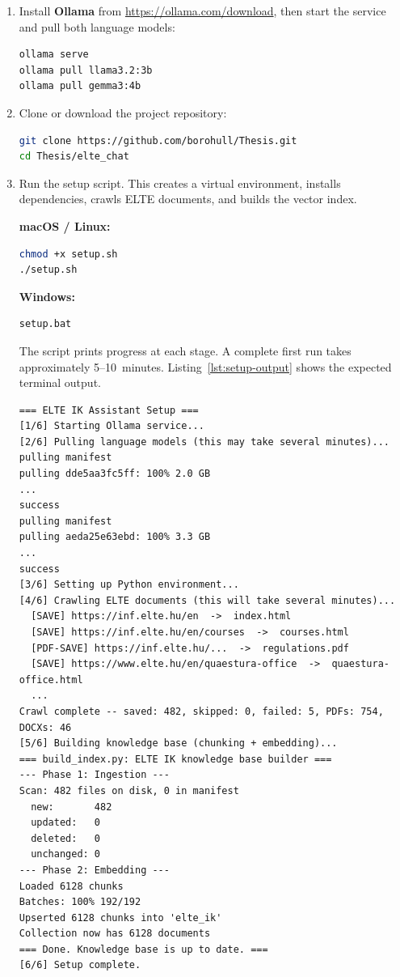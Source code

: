\begin{enumerate}
    \item Install \textbf{Ollama} from \url{https://ollama.com/download}, then
          start the service and pull both language models:
\begin{lstlisting}[language=bash]
ollama serve
ollama pull llama3.2:3b
ollama pull gemma3:4b
\end{lstlisting}

    \item Clone or download the project repository:
\begin{lstlisting}[language=bash]
git clone https://github.com/borohull/Thesis.git
cd Thesis/elte_chat
\end{lstlisting}

    \item Run the setup script. This creates a virtual environment, installs
          dependencies, crawls ELTE documents, and builds the vector index.

          \textbf{macOS / Linux:}
\begin{lstlisting}[language=bash]
chmod +x setup.sh
./setup.sh
\end{lstlisting}

          \textbf{Windows:}
\begin{lstlisting}[language=bash]
setup.bat
\end{lstlisting}

          The script prints progress at each stage. A complete first run takes
          approximately 5--10~minutes. Listing~\ref{lst:setup-output} shows the
          expected terminal output.

\begin{lstlisting}
=== ELTE IK Assistant Setup ===
[1/6] Starting Ollama service...
[2/6] Pulling language models (this may take several minutes)...
pulling manifest
pulling dde5aa3fc5ff: 100% 2.0 GB
...
success
pulling manifest
pulling aeda25e63ebd: 100% 3.3 GB
...
success
[3/6] Setting up Python environment...
[4/6] Crawling ELTE documents (this will take several minutes)...
  [SAVE] https://inf.elte.hu/en  ->  index.html
  [SAVE] https://inf.elte.hu/en/courses  ->  courses.html
  [PDF-SAVE] https://inf.elte.hu/...  ->  regulations.pdf
  [SAVE] https://www.elte.hu/en/quaestura-office  ->  quaestura-office.html
  ...
Crawl complete -- saved: 482, skipped: 0, failed: 5, PDFs: 754, DOCXs: 46
[5/6] Building knowledge base (chunking + embedding)...
=== build_index.py: ELTE IK knowledge base builder ===
--- Phase 1: Ingestion ---
Scan: 482 files on disk, 0 in manifest
  new:       482
  updated:   0
  deleted:   0
  unchanged: 0
--- Phase 2: Embedding ---
Loaded 6128 chunks
Batches: 100% 192/192
Upserted 6128 chunks into 'elte_ik'
Collection now has 6128 documents
=== Done. Knowledge base is up to date. ===
[6/6] Setup complete.


\end{lstlisting}
\end{enumerate}
